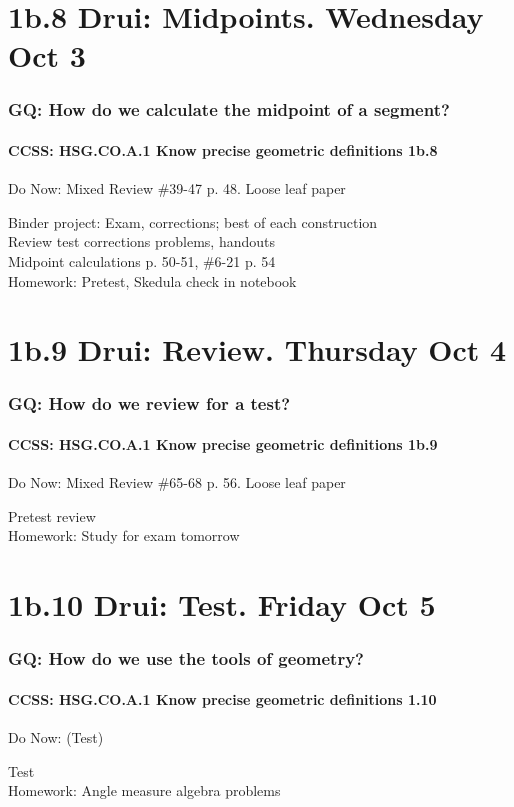 \documentclass{beamer}
\begin{document}
\section{1b.8 Drui: Midpoints. Wednesday Oct 3}
  \frame
  {
    \frametitle{GQ: How do we calculate the midpoint of a segment?}
    \framesubtitle{CCSS: HSG.CO.A.1 Know precise geometric definitions  \alert{1b.8}}

    \begin{block}{Do Now: Mixed Review \#39-47 p. 48. Loose leaf paper}
    \end{block}
    Binder project: Exam, corrections; best of each construction\\
    Review test corrections problems, handouts\\
    Midpoint calculations p. 50-51, \#6-21 p. 54\\
    \vspace{0.5cm}
    Homework: Pretest, Skedula check in notebook
  }

\section{1b.9 Drui: Review. Thursday Oct 4}
\frame
{
  \frametitle{GQ: How do we review for a test?}
  \framesubtitle{CCSS: HSG.CO.A.1 Know precise geometric definitions  \alert{1b.9}}

  \begin{block}{Do Now: Mixed Review \#65-68 p. 56. Loose leaf paper}
  \end{block}
  Pretest review\\
  \vspace{0.5cm}
  Homework: Study for \alert{exam tomorrow}
}

\section{1b.10 Drui: Test. Friday Oct 5}
        \frame
        {
          \frametitle{GQ: How do we use the tools of geometry?}
          \framesubtitle{CCSS: HSG.CO.A.1 Know precise geometric definitions  \alert{1.10}}

          \begin{block}{Do Now: (Test)}
          \end{block}
          Test\\
          \vspace{1cm}
          Homework: Angle measure algebra problems
        }
\end{document}
